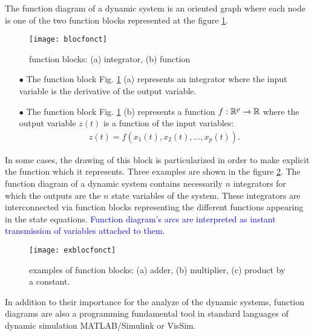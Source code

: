 The function diagram of a dynamic system is an oriented graph where each node is one of the two function blocks represented at the figure  \ref{Fig:blocfonct}.
\begin{figure}[htbp] 
   \centering
   \texttt{[image: blocfonct]} 
   \caption{function blocks: (a) integrator, (b) function}
   \label{Fig:blocfonct}
\end{figure}
\begin{itemize}
\item[$\bullet$] The function block  Fig. \ref{Fig:blocfonct} 
(a) represents an integrator where the input variable is the derivative of the output variable.
\item[$\bullet$] The function block  Fig. \ref{Fig:blocfonct} 
(b) represents a function  $f: \mathbb{R}^p \rightarrow \mathbb{R}$ where the output variable  $z(t)$ is a function of the input variables:
\begin{equation*} \begin{split}
z(t) = f(x_1(t), x_2(t), \dots , x_p(t)).
\end{split} \end{equation*}
\end{itemize}
In some cases, the drawing of this block is particularized in order to make explicit the function which it represents. Three examples are shown in the figure  \ref{Fig:exblocfonct}. The function diagram of a dynamic system contains necessarily $n$ integrators for which the outputs are the $n$ state variables of the system. These integrators are interconnected via function blocks representing the different functions appearing in the state equations. \textcolor{blue}{Function diagram’s arcs are interpreted as instant transmission of variables attached to them.}
\begin{figure}[htbp] 
   \centering
   \texttt{[image: exblocfonct]} 
   \caption{examples of function blocks: (a) adder, (b) multiplier, (c) product by a constant.}
   \label{Fig:exblocfonct}
\end{figure}

In addition to their importance for the analyze of the dynamic systems, function diagrams are also a programming fundamental tool in standard languages of dynamic simulation  MATLAB/Simulink or VisSim.

